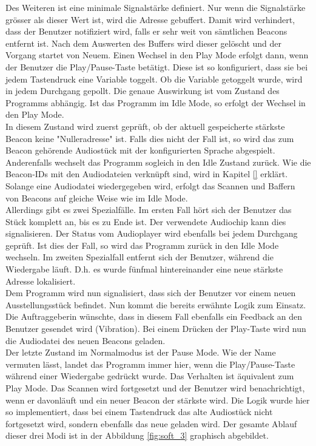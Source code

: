 Des Weiteren ist eine minimale Signalstärke definiert. Nur wenn die Signalstärke grösser als dieser Wert ist, wird die Adresse gebuffert. Damit wird verhindert, dass der Benutzer notifiziert wird, falls er sehr weit von sämtlichen Beacons entfernt ist.
Nach dem Auswerten des Buffers wird dieser gelöscht und der Vorgang startet von Neuem. Einen Wechsel in den Play Mode erfolgt dann, wenn der Benutzer die Play/Pause-Taste betätigt. Diese ist so konfiguriert, dass sie bei jedem Tastendruck eine Variable toggelt. Ob die Variable getoggelt wurde, wird in jedem Durchgang gepollt. Die genaue Auswirkung ist vom Zustand des Programms abhängig. Ist das Programm im Idle Mode, so erfolgt der Wechsel in den Play Mode.\\
In diesem Zustand wird zuerst geprüft, ob der aktuell gespeicherte stärkste Beacon keine "Nulleradresse" ist. Falls dies nicht der Fall ist, so wird das zum Beacon gehörende Audiostück mit der konfigurierten Sprache abgespielt. Anderenfalls wechselt das Programm sogleich in den Idle Zustand zurück. Wie die Beacon-IDs mit den Audiodateien verknüpft sind, wird in Kapitel \ref{} erklärt.
Solange eine Audiodatei wiedergegeben wird, erfolgt das Scannen und Baffern von Beacons auf gleiche Weise wie im Idle Mode.\\ Allerdings gibt es zwei Spezialfälle. Im ersten Fall hört sich der Benutzer das Stück komplett an, bis es zu Ende ist. Der verwendete Audiochip kann dies signalisieren. Der Status vom Audioplayer wird ebenfalls bei jedem Durchgang geprüft. Ist dies der Fall, so wird das Programm zurück in den Idle Mode wechseln. Im zweiten Spezialfall entfernt sich der Benutzer, während die Wiedergabe läuft. D.h. es wurde fünfmal hintereinander eine neue stärkste Adresse lokalisiert.\\ Dem Programm wird nun signalisiert, dass sich der Benutzer vor einem neuen Ausstellungsstück befindet. Nun kommt die bereits erwähnte Logik zum Einsatz. Die Auftraggeberin wünschte, dass in diesem Fall ebenfalls ein Feedback an den Benutzer gesendet wird (Vibration). Bei einem Drücken der Play-Taste wird nun die Audiodatei des neuen Beacons geladen.\\
Der letzte Zustand im Normalmodus ist der Pause Mode. Wie der Name vermuten lässt, landet das Programm immer hier, wenn die Play/Pause-Taste während einer Wiedergabe gedrückt wurde. Das Verhalten ist äquivalent zum Play Mode. Das Scannen wird fortgesetzt und der Benutzer wird benachrichtigt, wenn er davonläuft und ein neuer Beacon der stärkste wird. Die Logik wurde hier so implementiert, dass bei einem Tastendruck das alte Audiostück nicht fortgesetzt wird, sondern ebenfalls das neue geladen wird. 
Der gesamte Ablauf dieser drei Modi ist in der Abbildung \ref{fig:soft_3} graphisch abgebildet.

